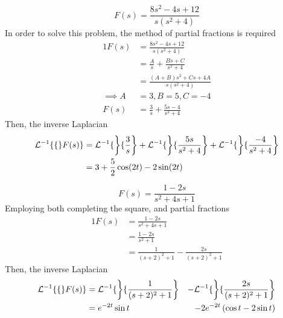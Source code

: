 \documentclass[diffeq.tex]{subfiles}
\begin{document}
    \begin{example}
        \begin{equation}
            F(s) = \frac{8s^{2} - 4s + 12}{s(s^{2} + 4)}
        \end{equation}
        In order to solve this problem, the method of partial fractions is required
        \begin{alignat}{1}
            F(s) &= \frac{8s^{2} - 4s + 12}{s(s^{2} + 4)}\\
            &= \frac{A}{s} + \frac{Bs + C}{s^{2} + 4}\\
            &= \frac{(A+B)s^{2} + Cs + 4A}{s(s^{2} + 4)}\\
            \implies A &= 3, B = 5, C = -4\\
            F(s) &= \frac{3}{s} + \frac{5s - 4}{s^{2} + 4}
        \end{alignat}
        Then, the inverse Laplacian
        \begin{alignat}{1}
            \mathcal{L}^{-1}\{\{\}F(s)\} &= \mathcal{L}^{-1}\{\left\}\{\frac{3}{s}\right\} + \mathcal{L}^{-1}\{\left\}\{\frac{5s}{s^{2} + 4}\right\} + \mathcal{L}^{-1}\{\left\}\{\frac{-4}{s^{2} + 4}\right\}\\
            &= 3 + \frac{5}{2}\cos(2t) - 2\sin(2t)
        \end{alignat}
    \end{example}
    \begin{example}
        \begin{equation}
            F(s) = \frac{1-2s}{s^{2} + 4s + 1}
        \end{equation}
        Employing both completing the square, and partial fractions
        \begin{alignat}{1}
            F(s) &= \frac{1-2s}{s^{2} + 4s + 1}\\
            &= \frac{1 - 2s}{s^{2} + 1}\\
            &= \frac{1}{(s + 2)^{2} + 1} - \frac{2s}{(s + 2)^{2} + 1}
        \end{alignat}
        Then, the inverse Laplacian
        \begin{alignat}{2}
            \mathcal{L}^{-1}\{\{\}F(s)\} &= \mathcal{L}^{-1}\{\left\}\{\frac{1}{(s + 2)^{2} + 1}\right\} &- \mathcal{L}^{-1}\{\left\}\{\frac{2s}{(s + 2)^{2} + 1}\right\}\\
            &= e^{-2t}\sin t &- 2e^{-2t}\left(\cos t - 2\sin t\right)
        \end{alignat}
    \end{example}
    \np
\end{document}
